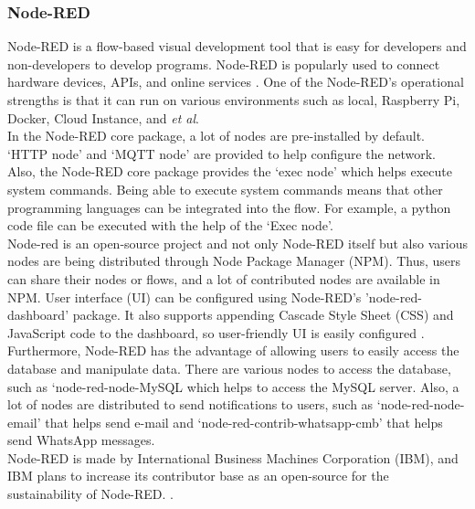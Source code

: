 \documentclass[conference]{IEEEtran}
\begin{document}
\subsubsection{Node-RED}
Node-RED is a flow-based visual development tool that is easy for developers and non-developers to develop programs. Node-RED is popularly used to connect hardware devices, APIs, and online services \cite{b18}.
One of the Node-RED’s operational strengths is that it can run on various environments such as local, Raspberry Pi, Docker, Cloud Instance, and \textit{et al}. \\
\indent In the Node-RED core package, a lot of nodes are pre-installed by default. ‘HTTP node’ and ‘MQTT node’ are provided to help configure the network. Also, the Node-RED core package provides the ‘exec node’ which helps execute system commands. Being able to execute system commands means that other programming languages can be integrated into the flow. For example, a python code file can be executed with the help of the ‘Exec node’. \\
\indent Node-red is an open-source project and not only Node-RED itself but also various nodes are being distributed through Node Package Manager (NPM). Thus, users can share their nodes or flows, and a lot of contributed nodes are available in NPM.
User interface (UI) can be configured using Node-RED’s ’node-red-dashboard’ package. It also supports appending Cascade Style Sheet (CSS) and JavaScript code to the dashboard, so user-friendly UI is easily configured \cite{b19}. Furthermore, Node-RED has the advantage of allowing users to easily access the database and manipulate data. There are various nodes to access the database, such as ‘node-red-node-MySQL which helps to access the MySQL server. Also, a lot of nodes are distributed to send notifications to users, such as ‘node-red-node-email’ that helps send e-mail and ‘node-red-contrib-whatsapp-cmb’ that helps send WhatsApp messages. \\
\indent Node-RED is made by International Business Machines Corporation (IBM), and IBM plans to increase its contributor base as an open-source for the sustainability of Node-RED. \cite{b20}.
\end{document}
